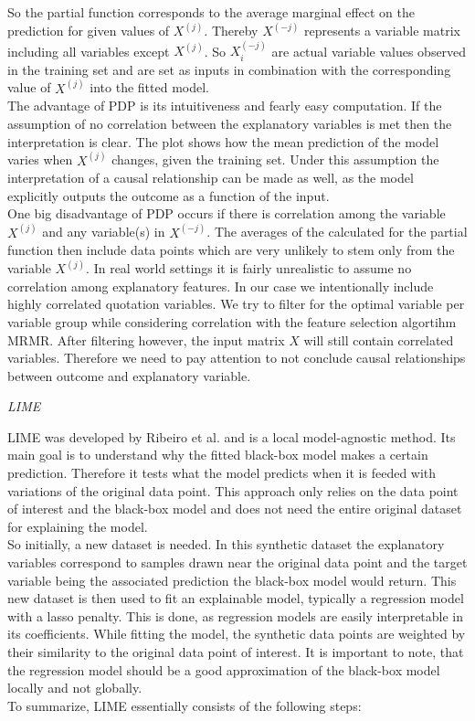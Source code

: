 \documentclass[12pt,titlepage]{article}
\begin{document}
So the partial function corresponds to the average marginal effect on the prediction for given values of $X^{(j)}$. Thereby $X^{(-j)}$ represents a variable matrix including all variables except $X^{(j)}$. So $X^{(-j)}_{i}$ are actual variable values observed in the training set and are set as inputs in combination with the corresponding value of $X^{(j)}$ into the fitted model. \\
The advantage of PDP is its intuitiveness and fearly easy computation. If the assumption of no correlation between the explanatory variables is met then the interpretation is clear. The plot shows how the mean prediction of the model varies when $X^{(j)}$ changes, given the training set. Under this assumption the interpretation of a causal relationship can be made as well, as the model explicitly outputs the outcome as a function of the input. \\
One big disadvantage of PDP occurs if there is correlation among the variable $X^{(j)}$ and any variable(s) in $X^{(-j)}$. The averages of the calculated for the partial function then include data points which are very unlikely to stem only from the variable $X^{(j)}$. In real world settings it is fairly unrealistic to assume no correlation among explanatory features. In our case we intentionally include highly correlated quotation variables. We try to filter for the optimal variable per variable group while considering correlation with the feature selection algortihm MRMR. After filtering however, the input matrix $X$ will still contain correlated variables. Therefore we need to pay attention to not conclude causal relationships between outcome and explanatory variable. \\
\vspace{3mm}

\textit{LIME}

\vspace{3mm}

LIME was developed by Ribeiro et al. \cite{lime} and is a local model-agnostic method. Its main goal is to understand why the fitted black-box model makes a certain prediction. Therefore it tests what the model predicts when it is feeded with variations of the original data point. This approach only relies on the data point of interest and the black-box model and does not need the entire original dataset for explaining the model. \\
So initially, a new dataset is needed. In this synthetic dataset the explanatory variables correspond to samples drawn near the original data point and the target variable being the associated prediction the black-box model would return. This new dataset is then used to fit an explainable model, typically a regression model with a lasso penalty. This is done, as regression models are easily interpretable in its coefficients. While fitting the model, the synthetic data points are weighted by their similarity to the original data point of interest. It is important to note, that the regression model should be a good approximation of the black-box model locally and not globally. \\
To summarize, LIME essentially consists of the following steps:
\end{document}
